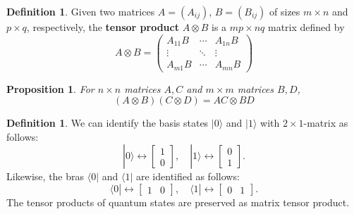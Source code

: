 \documentclass{beamer}
\theoremstyle{plain}
\newtheorem{prop}[thm]{Proposition}
\theoremstyle{definition}
\newtheorem{defn}[thm]{Definition}
\begin{document}
\begin{frame}
\begin{defn}
Given two matrices $A=(A_{ij})$, $B=(B_{ij})$
of sizes $m\times n$ and $p\times q$, respectively,
the \textbf{tensor product} $A\otimes B$ is 
a $mp\times nq$ matrix defined by 
$$A\otimes B = \begin{pmatrix}
	A_{11}B & \cdots & A_{1n}B \\
	\vdots & \ddots & \vdots \\
	A_{m1}B & \cdots &A_{mn}B \end{pmatrix}$$
\end{defn}
\begin{prop}
For $n\times n$ matrices $A, C$ and $m\times m$ matrices $B, D$,
	$$(A\otimes B)(C\otimes D) = AC\otimes BD$$
\end{prop}
\end{frame}

\begin{frame}
\begin{defn}
We can identify the basis states $|0\rangle$ and $|1\rangle$
with $2\times1$-matrix as follows:
	$$|0\rangle\longleftrightarrow\begin{bmatrix}1\\0\end{bmatrix},
	\quad |1\rangle\longleftrightarrow\begin{bmatrix}0\\1\end{bmatrix}.$$
Likewise, the bras $\langle0|$ and $\langle1|$ are identified as follows:
	$$\langle0|\longleftrightarrow\begin{bmatrix}1 & 0\end{bmatrix},
	\quad \langle1|\longleftrightarrow\begin{bmatrix}0 & 1 \end{bmatrix}.$$
The tensor products of quantum states are preserved as matrix tensor product.
\end{defn}
\end{frame}
\end{document}
